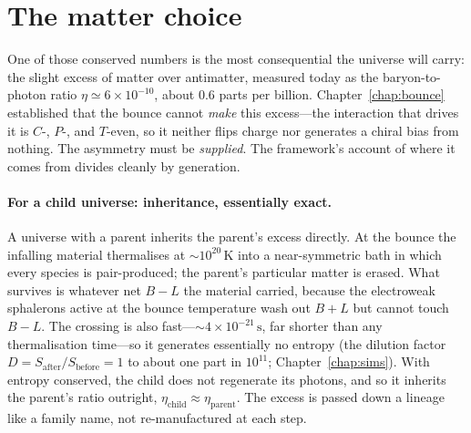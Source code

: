 \section{The matter choice}
\label{sec:matter-choice}

One of those conserved numbers is the most consequential the universe will carry:
the slight excess of matter over antimatter, measured today as the
baryon-to-photon ratio $\eta\simeq6\times10^{-10}$, about 0.6 parts per billion.
Chapter~\ref{chap:bounce} established that the bounce cannot \emph{make} this
excess---the interaction that drives it is $C$-, $P$-, and $T$-even, so it neither
flips charge nor generates a chiral bias from nothing. The asymmetry must be
\emph{supplied}. The framework's account of where it comes from divides cleanly by
generation.

\paragraph{For a child universe: inheritance, essentially exact.} A universe with
a parent inherits the parent's excess directly. At the bounce the infalling
material thermalises at $\sim10^{20}\,\mathrm{K}$ into a near-symmetric bath in
which every species is pair-produced; the parent's particular matter is erased.
What survives is whatever net $B-L$ the material carried, because the electroweak
sphalerons active at the bounce temperature wash out $B+L$ but cannot touch
$B-L$. The crossing is also fast---$\sim4\times10^{-21}\,\mathrm{s}$, far shorter
than any thermalisation time---so it generates essentially no entropy
(the dilution factor $D=S_{\mathrm{after}}/S_{\mathrm{before}}=1$ to about one part
in $10^{11}$; Chapter~\ref{chap:sims}). With entropy conserved, the child does not
regenerate its photons, and so it inherits the parent's ratio outright,
$\eta_{\mathrm{child}}\approx\eta_{\mathrm{parent}}$. The excess is passed down a
lineage like a family name, not re-manufactured at each step.

